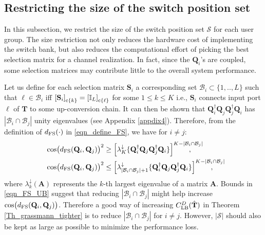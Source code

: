 \documentclass[journal,comsoc]{IEEEtran}
\begin{document}
\subsection{Restricting the size of the switch position set} \label{sec_restrict_sel}
In this subsection, we restrict the size of the switch position set $\mathcal{S}$ for each user group. The size restriction not only reduces the hardware cost of implementing the switch bank, but also reduces the computational effort of picking the best selection matrix for a channel realization. In fact, since the $\mathbf{Q}_i$'s are coupled, some selection matrices may contribute little to the overall system performance.

Let us define for each selection matrix $\mathbf{S}_i$ a corresponding set $\mathcal{B}_i \subset \{1,..,L\}$ such that $\ell \in \mathcal{B}_i$ iff ${[\mathbf{S}_i]}_{{\rm c}\{k\}} = {[\mathbb{I}_L]}_{{\rm c}\{\ell\}}$ for some $1 \leq k \leq K$ i.e., $\mathbf{S}_i$ connects input port $\ell$ of $\mathbf{T}$ to some up-conversion chain. 
It can then be shown that $\mathbf{Q}^{\dag}_i \mathbf{Q}_j \mathbf{Q}^{\dag}_j \mathbf{Q}_i$ has $|\mathcal{B}_i \cap \mathcal{B}_j|$ unity eigenvalues (see Appendix \ref{appdix4}). 
Therefore, from the definition of $d_{\rm FS}(\cdot)$ in \eqref{eqn_define_FS}, we have for $i \neq j$:
\begin{subequations}\label{eqn_FS_UB}
\begin{flalign}
& {\cos \! \big(d_{\rm FS} (\mathbf{Q}_i, \mathbf{Q}_j) \big)}^2 \geq {\left[ \lambda^{\downarrow}_{K}\{ \mathbf{Q}^{\dag}_i \mathbf{Q}_j \mathbf{Q}^{\dag}_j \mathbf{Q}_i \}\right]}^{K-|\mathcal{B}_i \cap \mathcal{B}_j|} \!\!\!\!\!\!\!\!\!\!\!\!, & \\
& {\cos \! \big(d_{\rm FS} (\mathbf{Q}_i, \mathbf{Q}_j) \big)}^2 \leq {\left[ \lambda^{\downarrow}_{|\mathcal{B}_i \cap \mathcal{B}_j|+1}\{ \mathbf{Q}^{\dag}_i \mathbf{Q}_j \mathbf{Q}^{\dag}_j \mathbf{Q}_i \}\right]}^{K-|\mathcal{B}_i \cap \mathcal{B}_j|} \!\!\!\!\!\!\!\!\!\!\!\!, &
\end{flalign}
\end{subequations}
where $\lambda^{\downarrow}_k(\mathbf{A})$ represents the $k$-th largest eigenvalue of a matrix $\mathbf{A}$. Bounds in \eqref{eqn_FS_UB} suggest that reducing $|\mathcal{B}_i \cap \mathcal{B}_j|$ might help increase $\cos \! \big(d_{\rm FS} (\mathbf{Q}_i, \mathbf{Q}_j) \big)$. Therefore a good way of increasing $C^{D}_{\rm LB}(\hat{\mathbf{T}})$ in Theorem \ref{Th_grassmann_tighter} is to reduce $|\mathcal{B}_i \cap \mathcal{B}_j|$ for $i \neq j$. However, $|\mathcal{S}|$ should also be kept as large as possible to minimize the performance loss. 
\end{document}
